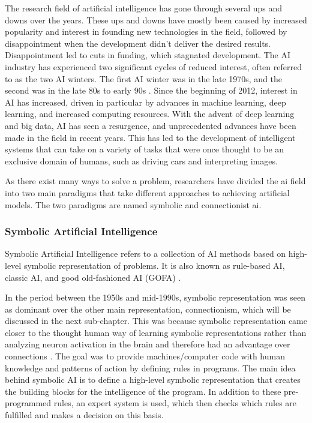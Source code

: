 The research field of artificial intelligence has gone through several ups and downs over the years. These ups and downs have mostly been caused by increased popularity and interest in founding new technologies in the field, followed by disappointment when the development didn't deliver the desired results. Disappointment led to cuts in funding, which stagnated development. The AI industry has experienced two significant cycles of reduced interest, often referred to as the two AI winters. The first AI winter was in the late 1970s, and the second was in the late 80s to early 90s \cite{floridiAIItsNew2020}. Since the beginning of 2012, interest in AI has increased, driven in particular by advances in machine learning, deep learning, and increased computing resources. With the advent of deep learning and big data, AI has seen a resurgence, and unprecedented advances have been made in the field in recent years. This has led to the development of intelligent systems that can take on a variety of tasks that were once thought to be an exclusive domain of humans, such as driving cars and interpreting images. 

As there exist many ways to solve a problem, researchers have divided the \gls{ai} field into two main paradigms that take different approaches to achieving artificial models. 
The two paradigms are named symbolic and connectionist \gls{ai}.


\subsubsection{Symbolic Artificial Intelligence}


Symbolic Artificial Intelligence refers to a collection of AI methods based on high-level symbolic representation of problems. It is also known as rule-based AI, classic AI, and good old-fashioned AI (GOFA) \cite{haugelandArtificialIntelligenceVery1989}. 

In the period between the 1950s and mid-1990s, symbolic representation was seen as dominant over the other main representation, connectionism, which will be discussed in the next sub-chapter. This was because symbolic representation came closer to the thought human way of learning symbolic representations rather than analyzing neuron activation in the brain and therefore had an advantage over connections \cite{garneloReconcilingDeepLearning2019}. 
The goal was to provide machines/computer code with human knowledge and patterns of action by defining rules in programs. The main idea behind symbolic AI is to define a high-level symbolic representation that creates the building blocks for the intelligence of the program. In addition to these pre-programmed rules, an expert system is used, which then checks which rules are fulfilled and makes a decision on this basis.

